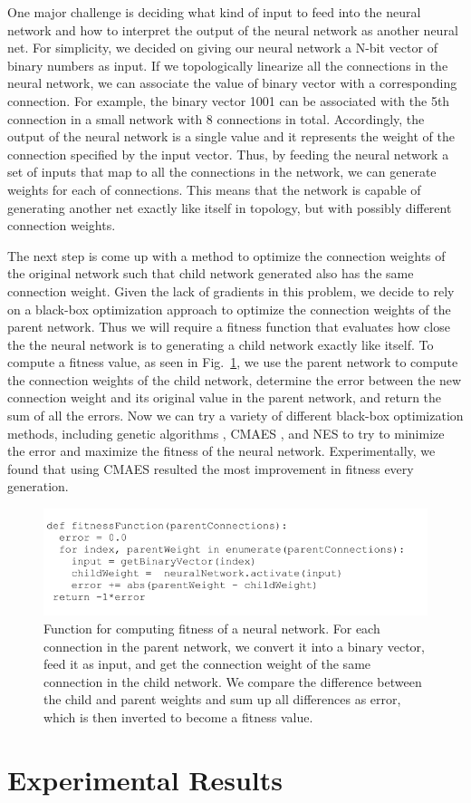 \documentclass[12pt]{article}
\begin{document}
One major challenge is deciding what kind of input to feed into the neural network and how to interpret the output of the neural network as another neural net. For simplicity, we decided on giving our neural network a N-bit vector of binary numbers as input. If we topologically linearize all the connections in the neural network, we can associate the value of binary vector with a corresponding connection. For example, the binary vector 1001 can be associated with the 5th connection in a small network with 8 connections in total. Accordingly, the output of the neural network is a single value and it represents the weight of the connection specified by the input vector. Thus, by feeding the neural network a set of inputs that map to all the connections in the network, we can generate weights for each of connections. This means that the network is capable of generating another net exactly like itself in topology, but with possibly different connection weights. 

The next step is come up with a method to optimize the connection weights of the original network such that child network generated also has the same connection weight. Given the lack of gradients in this problem, we decide to rely on a black-box optimization approach to optimize the connection weights of the parent network. Thus we will require a fitness function that evaluates how close the the neural network is to generating a child network exactly like itself. To compute a fitness value, as seen in Fig.~\ref{pseudo}, we use the parent network to compute the connection weights of the child network, determine the error between the new connection weight and its original value in the parent network, and return the sum of all the errors. Now we can try a variety of different black-box optimization methods, including genetic algorithms \cite{deb2002fast}, CMAES \cite{hansen2003reducing}, and NES \cite{wierstra2008natural} to try to minimize the error and maximize the fitness of the neural network. Experimentally, we found that using CMAES resulted the most improvement in fitness every generation. 

\begin{figure}[h]
\begin{center}
  \includegraphics[width=0.8\linewidth]{pseudo.png}
\end{center}
   \caption{Function for computing fitness of a neural network. For each connection in the parent network, we convert it into a binary vector, feed it as input, and get the connection weight of the same connection in the child network. We compare the difference between the child and parent weights and sum up all differences as error, which is then inverted to become a fitness value.}
\label{pseudo}
\end{figure} 

\section{Experimental Results} \label{results}



\end{document}
